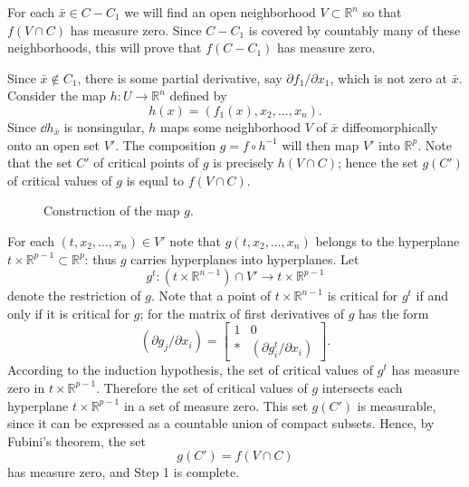 For each $\bar{x} \in C - C_1$ we will find an open neighborhood $V \subset \mathbb{R}^n$ so that $f(V \cap C)$ has measure zero. Since $C - C_1$ is covered by countably many of these neighborhoods, this will prove that $f(C - C_1)$ has measure zero.

Since $\bar{x} \notin C_1$, there is some partial derivative, say $\partial f_1 / \partial x_1$, which is not zero at $\bar{x}$. Consider the map $h : U \to \mathbb{R}^n$ defined by
\[
h(x) = (f_1(x), x_2, \ldots, x_n).
\]
Since $\dd h_{\bar{x}}$ is nonsingular, $h$ maps some neighborhood $V$ of $\bar{x}$ diffeomorphically onto an open set $V'$. The composition $g = f \circ h^{-1}$ will then map $V'$ into $\mathbb{R}^p$. Note that the set $C'$ of critical points of $g$ is precisely $h(V \cap C)$; hence the set $g(C')$ of critical values of $g$ is equal to $f(V \cap C)$.

\begin{figure}[htbp]
\centering
\setcounter{figure}{4}%
\caption{Construction of the map $g$.}\label{fig:milnor-05}
\end{figure}



For each $(t, x_2, \ldots, x_n) \in V'$ note that $g(t, x_2, \ldots, x_n)$ belongs to the hyperplane $t \times \mathbb{R}^{p-1} \subset \mathbb{R}^p$: thus $g$ carries hyperplanes into hyperplanes. Let
\[
g^t : (t \times \mathbb{R}^{n-1}) \cap V' \to t \times \mathbb{R}^{p-1}
\]
denote the restriction of $g$. Note that a point of $t \times \mathbb{R}^{n-1}$ is critical for $g^t$ if and only if it is critical for $g$; for the matrix of first derivatives of $g$ has the form
\[
(\partial g_j / \partial x_i) = \begin{bmatrix} 1 & 0 \\ * & (\partial g_i^t / \partial x_i) \end{bmatrix}.
\]
According to the induction hypothesis, the set of critical values of $g^t$ has measure zero in $t \times \mathbb{R}^{p-1}$. Therefore the set of critical values of $g$ intersects each hyperplane $t \times \mathbb{R}^{p-1}$ in a set of measure zero. This set $g(C')$ is measurable, since it can be expressed as a countable union of compact subsets. Hence, by Fubini's theorem, the set
\[
g(C') = f(V \cap C)
\]
has measure zero, and Step 1 is complete.

